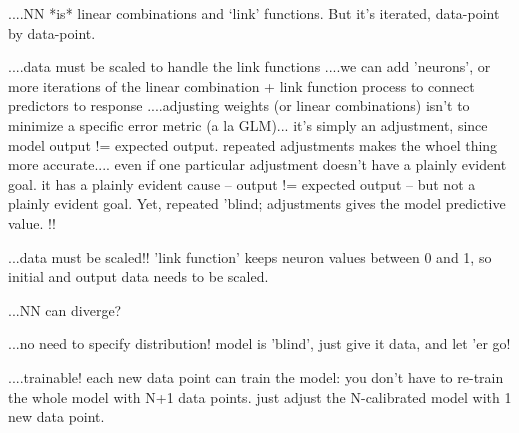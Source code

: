 \documentclass[12pt]{article}
\begin{document}
....NN *is* linear combinations and `link' functions.  But it's iterated, data-point by data-point.

....data must be scaled to handle the link functions
....we can add 'neurons', or more iterations of the linear combination + link function process to connect predictors to response
....adjusting weights (or linear combinations) isn't to minimize a specific error metric (a la GLM)... it's simply an adjustment, since
    model output != expected output.  repeated adjustments makes the whoel thing more accurate.... even if one particular adjustment doesn't
    have a plainly evident goal.  it has a plainly evident cause -- output != expected output -- but not a plainly evident goal.  Yet, repeated
	'blind; adjustments gives the model predictive value.  !!

...data must be scaled!! 'link function' keeps neuron values between 0 and 1, so initial and output data needs to be scaled.

...NN can diverge?

...no need to specify distribution!  model is 'blind', just give it data, and let 'er go!

....trainable!  each new data point can train the model:  you don't have to re-train the whole model with N+1 data points.  just adjust the
N-calibrated model with 1 new data point.

\end{document}
